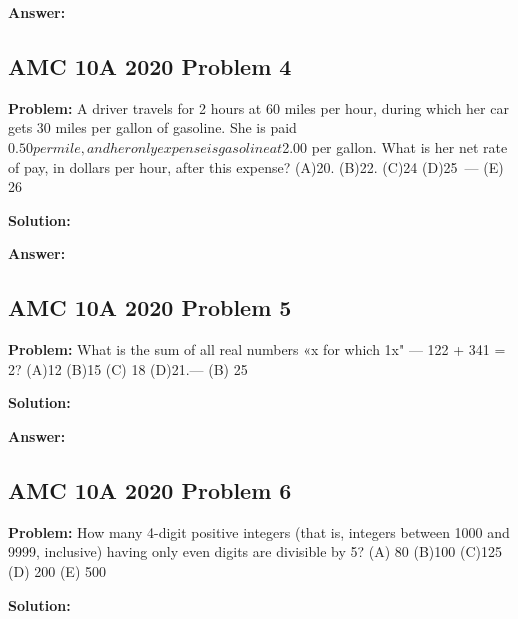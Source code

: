 \documentclass{article}
\newenvironment{problem}{\textbf{Problem: }}{\\}
\newenvironment{solution}{\textbf{Solution: }}{\\}
\newenvironment{answer}{\textbf{Answer: }}{\\}
\begin{document}
\begin{answer}
\end{answer}

\subsection{AMC 10A 2020 Problem 4}

\begin{problem}
A driver travels for 2 hours at 60 miles per hour, during which her car gets 30 miles per gallon of gasoline. She is paid $0.50 per mile, and her only expense is gasoline at $2.00 per gallon. What is her net rate of pay, in dollars per hour, after this expense? (A)20. (B)22. (C)24 (D)25~— (E) 26
\end{problem}

\begin{solution}
\end{solution}

\begin{answer}
\end{answer}

\subsection{AMC 10A 2020 Problem 5}

\begin{problem}
What is the sum of all real numbers «x for which 1x" — 122 + 341 = 2? (A)12 (B)15 (C) 18 (D)21.— (B) 25
\end{problem}

\begin{solution}
\end{solution}

\begin{answer}
\end{answer}

\subsection{AMC 10A 2020 Problem 6}

\begin{problem}
How many 4-digit positive integers (that is, integers between 1000 and 9999, inclusive) having only even digits are divisible by 5? (A) 80 (B)100 (C)125 (D) 200 (E) 500
\end{problem}

\begin{solution}
\end{solution}
\end{document}
